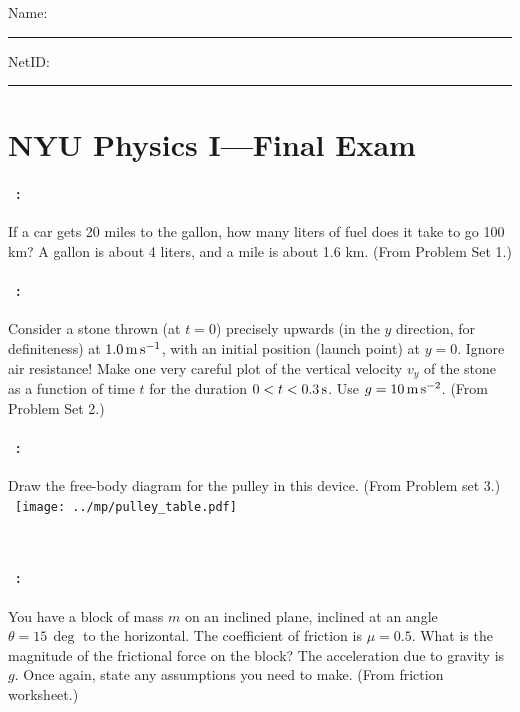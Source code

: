 \documentclass[12pt]{article} 
\begin{document}
\noindent
Name: \rule[-1ex]{0.55\textwidth}{0.1pt}
NetID: \rule[-1ex]{0.2\textwidth}{0.1pt}

\section*{NYU Physics I---Final Exam}

\paragraph{\problemname~\theproblem:}%
If a car gets 20 miles to the gallon, how many liters of fuel
does it take to go 100 km? A gallon is about 4 liters, and a mile is
about 1.6 km.
(From Problem Set 1.)

\vfill

\paragraph{\problemname~\theproblem:}%
Consider a stone thrown (at $t=0$) precisely upwards (in the $y$
direction, for definiteness) at $1.0\,\mathrm{m}\,\mathrm{s}^{-1}$, with an initial
position (launch point) at $y=0$.  Ignore air resistance! Make one
very careful plot of the vertical velocity $v_y$ of the stone as a
function of time $t$ for the duration $0<t<0.3\,\mathrm{s}$. Use
$g=10\,\mathrm{m}\,\mathrm{s}^{-2}$.
(From Problem Set 2.)

\vfill

\paragraph{\problemname~\theproblem:}%
Draw the free-body diagram for the pulley in this device.
(From Problem set 3.)\\
~\hfill\texttt{[image: ../mp/pulley\_table.pdf]}\hfill~

\vfill
~
\clearpage

\paragraph{\problemname~\theproblem:}%
You have a block of mass $m$ on an inclined
plane, inclined at an angle $\theta=15\,\deg$ to the horizontal. The
coefficient of friction is $\mu=0.5$. What is the magnitude of the
frictional force on the block? The acceleration due to gravity is $g$.
Once again, state any assumptions you need to make.
(From friction worksheet.)
\end{document}
